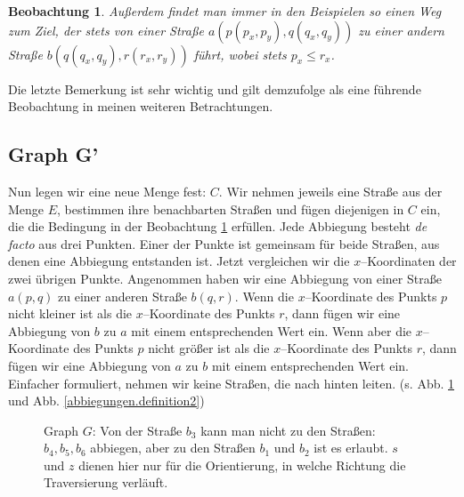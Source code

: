 \documentclass[a4paper,10pt,ngerman]{scrartcl}
\newtheorem{lemma}{Beobachtung}
\begin{document}

\begin{lemma}
\label{niedotylu} Außerdem findet man immer in den Beispielen so einen Weg zum Ziel,
der stets von einer Straße $a(p(p_x,p_y),q(q_x,q_y))$ zu einer andern Straße $b(q(q_x,q_y), r(r_x,r_y))$ führt,
wobei stets $p_x \leq r_x$.
\end{lemma}
Die letzte Bemerkung ist sehr wichtig und gilt demzufolge als eine führende Beobachtung
in meinen weiteren Betrachtungen.\\

\subsection{Graph G'} \label{graphg2}

Nun legen wir eine neue Menge fest: $C$.
Wir nehmen jeweils eine Straße aus der Menge $E$, bestimmen ihre benachbarten Straßen
und fügen diejenigen in $C$ ein, die die Bedingung in der Beobachtung \ref{niedotylu} erfüllen.
Jede Abbiegung besteht \textit{de facto} aus drei Punkten. Einer der Punkte ist gemeinsam für beide Straßen,
aus denen eine Abbiegung entstanden ist. Jetzt vergleichen wir die $x$--Koordinaten der zwei übrigen Punkte.
Angenommen haben wir eine Abbiegung von einer Straße $a(p,q)$ zu einer anderen Straße $b(q, r)$. 
Wenn die $x$--Koordinate des Punkts $p$ nicht kleiner ist als die $x$--Koordinate des Punkts $r$,
dann fügen wir eine Abbiegung von $b$ zu $a$ mit einem entsprechenden Wert ein.
Wenn aber die $x$--Koordinate des Punkts $p$ nicht größer ist als die $x$--Koordinate des Punkts $r$,
dann fügen wir eine Abbiegung von $a$ zu $b$ mit einem entsprechenden Wert ein.
Einfacher formuliert, nehmen wir keine Straßen, die nach \glqq hinten\grqq{} leiten. (s. Abb. \ref{abbiegungen.definition}
und Abb. \ref{abbiegungen.definition2})\\

\begin{figure}[h] \centerline {
} 
\caption{Graph $G$: Von der Straße $b_3$ kann man nicht zu den Straßen: $b_4, b_5, b_6$ abbiegen, aber zu den Straßen $b_1$ und $b_2$ ist es erlaubt. $s$ und $z$ dienen hier nur für die Orientierung, in welche Richtung die Traversierung verläuft.}
\label{abbiegungen.definition}
\end{figure}
\end{document}
